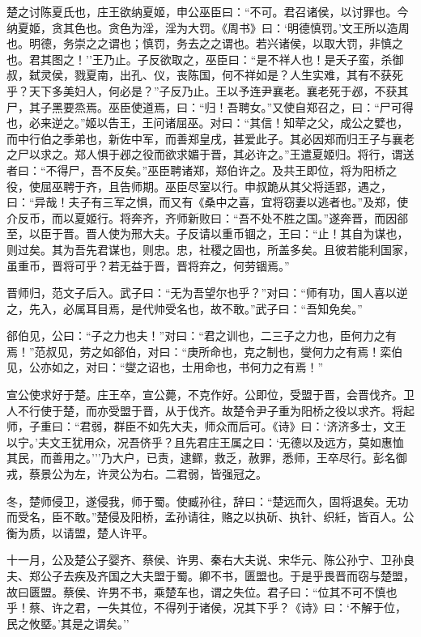 \documentclass[]{article}
\begin{document}
楚之讨陈夏氏也，庄王欲纳夏姬，申公巫臣曰：``不可。君召诸侯，以讨罪也。今纳夏姬，贪其色也。贪色为淫，淫为大罚。《周书》曰：`明德慎罚。'文王所以造周也。明德，务崇之之谓也；慎罚，务去之之谓也。若兴诸侯，以取大罚，非慎之也。君其图之！''王乃止。子反欲取之，巫臣曰：``是不祥人也！是夭子蛮，杀御叔，弑灵侯，戮夏南，出孔、仪，丧陈国，何不祥如是？人生实难，其有不获死乎？天下多美妇人，何必是？''子反乃止。王以予连尹襄老。襄老死于邲，不获其尸，其子黑要烝焉。巫臣使道焉，曰：``归！吾聘女。''又使自郑召之，曰：``尸可得也，必来逆之。''姬以告王，王问诸屈巫。对曰：``其信！知荦之父，成公之嬖也，而中行伯之季弟也，新佐中军，而善郑皇戌，甚爱此子。其必因郑而归王子与襄老之尸以求之。郑人惧于邲之役而欲求媚于晋，其必许之。''王遣夏姬归。将行，谓送者曰：``不得尸，吾不反矣。''巫臣聘诸郑，郑伯许之。及共王即位，将为阳桥之役，使屈巫聘于齐，且告师期。巫臣尽室以行。申叔跪从其父将适郢，遇之，曰：``异哉！夫子有三军之惧，而又有《桑中之喜，宜将窃妻以逃者也。''及郑，使介反币，而以夏姬行。将奔齐，齐师新败曰：``吾不处不胜之国。''遂奔晋，而因郤至，以臣于晋。晋人使为邢大夫。子反请以重币锢之，王曰：``止！其自为谋也，则过矣。其为吾先君谋也，则忠。忠，社稷之固也，所盖多矣。且彼若能利国家，虽重币，晋将可乎？若无益于晋，晋将弃之，何劳锢焉。''

晋师归，范文子后入。武子曰：``无为吾望尔也乎？''对曰：``师有功，国人喜以逆之，先入，必属耳目焉，是代帅受名也，故不敢。''武子曰：``吾知免矣。''

郤伯见，公曰：``子之力也夫！''对曰：``君之训也，二三子之力也，臣何力之有焉！''范叔见，劳之如郤伯，对曰：``庚所命也，克之制也，燮何力之有焉！栾伯见，公亦如之，对曰：``燮之诏也，士用命也，书何力之有焉！''

宣公使求好于楚。庄王卒，宣公薨，不克作好。公即位，受盟于晋，会晋伐齐。卫人不行使于楚，而亦受盟于晋，从于伐齐。故楚令尹子重为阳桥之役以求齐。将起师，子重曰：``君弱，群臣不如先大夫，师众而后可。《诗》曰：`济济多士，文王以宁。'夫文王犹用众，况吾侪乎？且先君庄王属之曰：`无德以及远方，莫如惠恤其民，而善用之。'''乃大户，已责，逮鳏，救乏，赦罪，悉师，王卒尽行。彭名御戎，蔡景公为左，许灵公为右。二君弱，皆强冠之。

冬，楚师侵卫，遂侵我，师于蜀。使臧孙往，辞曰：``楚远而久，固将退矣。无功而受名，臣不敢。''楚侵及阳桥，孟孙请往，赂之以执斫、执针、织紝，皆百人。公衡为质，以请盟，楚人许平。

十一月，公及楚公子婴齐、蔡侯、许男、秦右大夫说、宋华元、陈公孙宁、卫孙良夫、郑公子去疾及齐国之大夫盟于蜀。卿不书，匮盟也。于是乎畏晋而窃与楚盟，故曰匮盟。蔡侯、许男不书，乘楚车也，谓之失位。君子曰：``位其不可不慎也乎！蔡、许之君，一失其位，不得列于诸侯，况其下乎？《诗》曰：`不解于位，民之攸塈。'其是之谓矣。''
\end{document}
